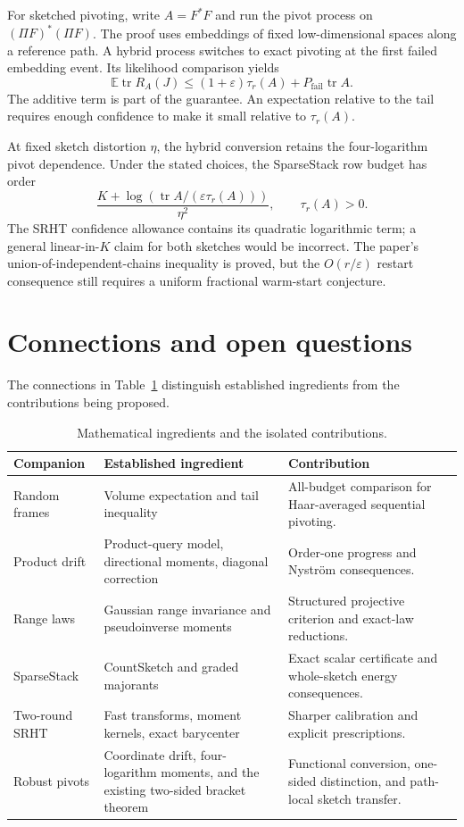 \documentclass[11pt,a4paper]{article}
\newcommand{\E}{\mathbb E}
\newcommand{\tr}{\operatorname{tr}}
\newcommand{\eps}{\varepsilon}
\begin{document}
For sketched pivoting, write $A=F^*F$ and run the pivot process on
$(\Pi F)^*(\Pi F)$. The proof uses embeddings of fixed low-dimensional spaces
along a reference path. A hybrid process switches to exact pivoting at the
first failed embedding event. Its likelihood comparison yields
\begin{equation}\label{eq:additive}
 \E\tr R_A(J)\le(1+\eps)\tau_r(A)+P_{\mathrm{fail}}\tr A.
\end{equation}
The additive term is part of the guarantee. An expectation relative to the
tail requires enough confidence to make it small relative to $\tau_r(A)$.

At fixed sketch distortion $\eta$, the hybrid conversion retains the
four-logarithm pivot dependence. Under the stated choices, the SparseStack
row budget has order
\[
 \frac{K+\log(\tr A/(\eps\tau_r(A)))}{\eta^2},
 \qquad \tau_r(A)>0.
\]
The SRHT confidence allowance contains its quadratic logarithmic term;
a general linear-in-$K$ claim for both sketches would be incorrect.
The paper's union-of-independent-chains inequality is proved, but the
$O(r/\eps)$ restart consequence still requires a uniform fractional
warm-start conjecture.

\section{Connections and open questions}
The connections in Table~\ref{tab:map} distinguish established ingredients
from the contributions being proposed.
\begin{table}[ht]
\centering\small
\begin{tabularx}{\textwidth}{@{}p{}p{}X@{}}
\toprule
Companion & Established ingredient & Contribution\\
\midrule
Random frames & Volume expectation and tail inequality & All-budget
comparison for Haar-averaged sequential pivoting.\\
Product drift & Product-query model, directional moments, diagonal
correction & Order-one progress and Nystr\"om consequences.\\
Range laws & Gaussian range invariance and pseudoinverse moments &
Structured projective criterion and exact-law reductions.\\
SparseStack & CountSketch and graded majorants & Exact scalar certificate
and whole-sketch energy consequences.\\
Two-round SRHT & Fast transforms, moment kernels, exact barycenter &
Sharper calibration and explicit prescriptions.\\
Robust pivots & Coordinate drift, four-logarithm moments, and the existing
two-sided bracket theorem & Functional conversion, one-sided distinction,
and path-local sketch transfer.\\
\bottomrule
\end{tabularx}
\caption{Mathematical ingredients and the isolated contributions.}
\label{tab:map}
\end{table}
\end{document}
